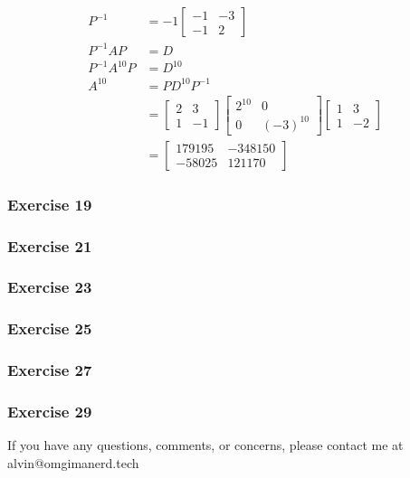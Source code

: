 \documentclass{math}
\begin{document}
\begin{align*}
  P^{-1} &= -1\begin{bmatrix}-1 & -3 \\ -1 & 2\end{bmatrix} \\
  P^{-1}AP &= D \\
  P^{-1}A^{10}P &= D^{10} \\
  A^{10} &= PD^{10}P^{-1} \\
  &= \begin{bmatrix}2 & 3 \\ 1 & -1\end{bmatrix}
    \begin{bmatrix}2^{10} & 0 \\ 0 & (-3)^{10}\end{bmatrix}
    \begin{bmatrix}1 & 3 \\ 1 & -2\end{bmatrix} \\
  &= \begin{bmatrix}
    179195 & -348150 \\
    -58025 & 121170
  \end{bmatrix}
\end{align*}

\subsubsection*{Exercise 19}
\subsubsection*{Exercise 21}
\subsubsection*{Exercise 23}
\subsubsection*{Exercise 25}
\subsubsection*{Exercise 27}
\subsubsection*{Exercise 29}

\begin{center}
  If you have any questions, comments, or concerns, please contact me at
  alvin@omgimanerd.tech
\end{center}
\end{document}
